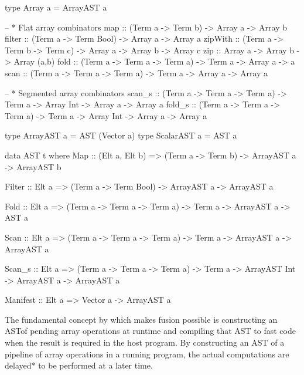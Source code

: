 \documentclass[preamble.tex]{subfiles}
\begin{document}
\begin{hscode2}[%
    caption={\LiveFusion interface functions. Typeclass constraints on array elements have been omitted for brevity.},%
    label=lst:LiveFusion-interface,%
]
type Array a = ArrayAST a

-- * Flat array combinators
map      :: (Term a -> Term b) -> Array a -> Array b
filter   :: (Term a -> Term Bool) -> Array a -> Array a
zipWith  :: (Term a -> Term b -> Term c) -> Array a -> Array b -> Array c
zip      :: Array a -> Array b -> Array (a,b)
fold     :: (Term a -> Term a -> Term a) -> Term a -> Array a -> a
scan     :: (Term a -> Term a -> Term a) -> Term a -> Array a -> Array a

-- * Segmented array combinators
scan_s   :: (Term a -> Term a -> Term a) -> Term a
         -> Array Int -> Array a -> Array a
fold_s   :: (Term a -> Term a -> Term a) -> Term a
         -> Array Int -> Array a -> Array a
\end{hscode2}


\begin{hscode2}[%
    caption={\LiveFusion AST (partial).},%
    label=lst:LiveFusion-AST,%
]
type ArrayAST a = AST (Vector a)
type ScalarAST a = AST a

data AST t where
  Map      :: (Elt a, Elt b)
           => (Term a -> Term b)
           -> ArrayAST a
           -> ArrayAST b

  Filter   :: Elt a
           => (Term a -> Term Bool)
           -> ArrayAST a
           -> ArrayAST a

  Fold     :: Elt a
           => (Term a -> Term a -> Term a)
           -> Term a
           -> ArrayAST a
           -> AST a

  Scan     :: Elt a
           => (Term a -> Term a -> Term a)
           -> Term a
           -> ArrayAST a
           -> ArrayAST a

  Scan_s   :: Elt a
           => (Term a -> Term a -> Term a)
           -> Term a
           -> ArrayAST Int
           -> ArrayAST a
           -> ArrayAST a

  Manifest :: Elt a
           => Vector a
           -> ArrayAST a
\end{hscode2}

The fundamental concept by which \LiveFusion makes fusion possible is constructing an AST\iast of pending array operations at runtime and compiling that AST to fast code when the result is required in the host program. By constructing an AST of a pipeline of array operations in a running program, the actual computations are \*delayed* to be performed at a later time.
\end{document}

